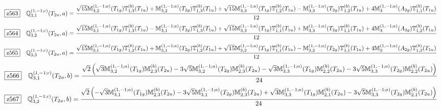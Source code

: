 \documentclass[fleqn,10pt,landscape]{jsarticle}
\begin{document}
\begin{dmath*}
\hspace*{3mm}\fbox{z563}\quad \mathbb{Q}_{3,1}^{(1,-1;c)}(T_{2u},a)=\frac{\sqrt{15} \mathbb{M}_{3,2}^{(1,-1;a)}(T_{1g}) \mathbb{T}_{1,3}^{(b)}(T_{1u}) + \mathbb{M}_{3,2}^{(1,-1;a)}(T_{2g}) \mathbb{T}_{1,3}^{(b)}(T_{1u}) + \sqrt{15} \mathbb{M}_{3,3}^{(1,-1;a)}(T_{1g}) \mathbb{T}_{1,2}^{(b)}(T_{1u}) - \mathbb{M}_{3,3}^{(1,-1;a)}(T_{2g}) \mathbb{T}_{1,2}^{(b)}(T_{1u}) + 4 \mathbb{M}_{3}^{(1,-1;a)}(A_{2g}) \mathbb{T}_{1,1}^{(b)}(T_{1u})}{12}
\end{dmath*}
\begin{dmath*}
\hspace*{3mm}\fbox{z564}\quad \mathbb{Q}_{3,2}^{(1,-1;c)}(T_{2u},a)=\frac{\sqrt{15} \mathbb{M}_{3,1}^{(1,-1;a)}(T_{1g}) \mathbb{T}_{1,3}^{(b)}(T_{1u}) - \mathbb{M}_{3,1}^{(1,-1;a)}(T_{2g}) \mathbb{T}_{1,3}^{(b)}(T_{1u}) + \sqrt{15} \mathbb{M}_{3,3}^{(1,-1;a)}(T_{1g}) \mathbb{T}_{1,1}^{(b)}(T_{1u}) + \mathbb{M}_{3,3}^{(1,-1;a)}(T_{2g}) \mathbb{T}_{1,1}^{(b)}(T_{1u}) + 4 \mathbb{M}_{3}^{(1,-1;a)}(A_{2g}) \mathbb{T}_{1,2}^{(b)}(T_{1u})}{12}
\end{dmath*}
\begin{dmath*}
\hspace*{3mm}\fbox{z565}\quad \mathbb{Q}_{3,3}^{(1,-1;c)}(T_{2u},a)=\frac{\sqrt{15} \mathbb{M}_{3,1}^{(1,-1;a)}(T_{1g}) \mathbb{T}_{1,2}^{(b)}(T_{1u}) + \mathbb{M}_{3,1}^{(1,-1;a)}(T_{2g}) \mathbb{T}_{1,2}^{(b)}(T_{1u}) + \sqrt{15} \mathbb{M}_{3,2}^{(1,-1;a)}(T_{1g}) \mathbb{T}_{1,1}^{(b)}(T_{1u}) - \mathbb{M}_{3,2}^{(1,-1;a)}(T_{2g}) \mathbb{T}_{1,1}^{(b)}(T_{1u}) + 4 \mathbb{M}_{3}^{(1,-1;a)}(A_{2g}) \mathbb{T}_{1,3}^{(b)}(T_{1u})}{12}
\end{dmath*}
\begin{dmath*}
\hspace*{3mm}\fbox{z566}\quad \mathbb{Q}_{3,1}^{(1,-1;c)}(T_{2u},b)=\frac{\sqrt{2} \left(\sqrt{3} \mathbb{M}_{3,2}^{(1,-1;a)}(T_{1g}) \mathbb{M}_{2,3}^{(b)}(T_{2u}) - 3 \sqrt{5} \mathbb{M}_{3,2}^{(1,-1;a)}(T_{2g}) \mathbb{M}_{2,3}^{(b)}(T_{2u}) - \sqrt{3} \mathbb{M}_{3,3}^{(1,-1;a)}(T_{1g}) \mathbb{M}_{2,2}^{(b)}(T_{2u}) - 3 \sqrt{5} \mathbb{M}_{3,3}^{(1,-1;a)}(T_{2g}) \mathbb{M}_{2,2}^{(b)}(T_{2u})\right)}{24}
\end{dmath*}
\begin{dmath*}
\hspace*{3mm}\fbox{z567}\quad \mathbb{Q}_{3,2}^{(1,-1;c)}(T_{2u},b)=\frac{\sqrt{2} \left(- \sqrt{3} \mathbb{M}_{3,1}^{(1,-1;a)}(T_{1g}) \mathbb{M}_{2,3}^{(b)}(T_{2u}) - 3 \sqrt{5} \mathbb{M}_{3,1}^{(1,-1;a)}(T_{2g}) \mathbb{M}_{2,3}^{(b)}(T_{2u}) + \sqrt{3} \mathbb{M}_{3,3}^{(1,-1;a)}(T_{1g}) \mathbb{M}_{2,1}^{(b)}(T_{2u}) - 3 \sqrt{5} \mathbb{M}_{3,3}^{(1,-1;a)}(T_{2g}) \mathbb{M}_{2,1}^{(b)}(T_{2u})\right)}{24}
\end{dmath*}
\end{document}
